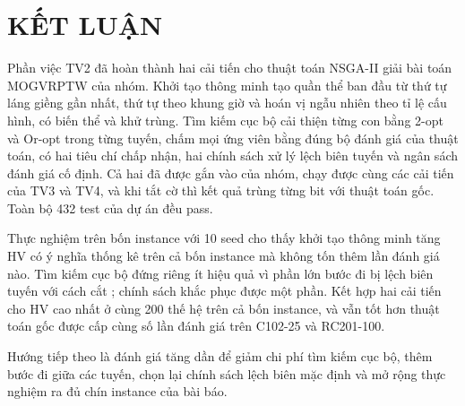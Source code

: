 \chapter*{KẾT LUẬN}

Phần việc TV2 đã hoàn thành hai cải tiến cho thuật toán NSGA-II giải bài toán MOGVRPTW của nhóm. Khởi tạo
thông minh tạo quần thể ban đầu từ thứ tự láng giềng gần nhất, thứ tự theo khung giờ và hoán vị ngẫu
nhiên theo tỉ lệ cấu hình, có biến thể và khử trùng. Tìm kiếm cục bộ cải thiện từng con bằng 2-opt và
Or-opt trong từng tuyến, chấm mọi ứng viên bằng đúng bộ đánh giá của thuật toán, có hai tiêu chí chấp
nhận, hai chính sách xử lý lệch biên tuyến và ngân sách đánh giá cố định. Cả hai đã được gắn vào
 của nhóm, chạy được cùng các cải tiến của TV3 và TV4, và khi tắt cờ thì kết quả trùng từng
bit với thuật toán gốc. Toàn bộ 432 test của dự án đều pass.

Thực nghiệm trên bốn instance với 10 seed cho thấy khởi tạo thông minh tăng HV có ý nghĩa thống kê trên cả
bốn instance mà không tốn thêm lần đánh giá nào. Tìm kiếm cục bộ đứng riêng ít hiệu quả vì phần lớn bước
đi bị lệch biên tuyến với cách cắt ; chính sách  khắc phục được
một phần. Kết hợp hai cải tiến cho HV cao nhất ở cùng 200 thế hệ trên cả bốn instance, và vẫn tốt hơn thuật
toán gốc được cấp cùng số lần đánh giá trên C102-25 và RC201-100.

Hướng tiếp theo là đánh giá tăng dần để giảm chi phí tìm kiếm cục bộ, thêm bước đi giữa các tuyến, chọn
lại chính sách lệch biên mặc định và mở rộng thực nghiệm ra đủ chín instance của bài báo.
